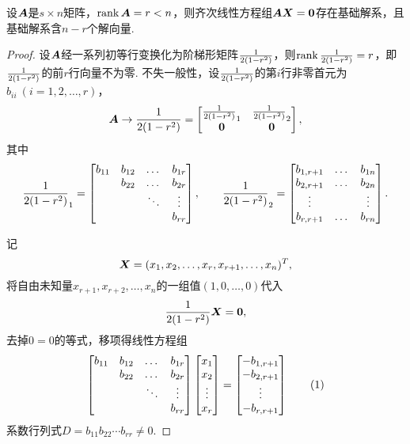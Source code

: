 \begin{theorem}\label{theorem:线性方程组.齐次线性方程组的解向量个数}
设\(\boldsymbol{A}\)是\(s \times n\)矩阵，\(\rank\boldsymbol{A} = r < n\)，则齐次线性方程组\(\boldsymbol{A}\boldsymbol{X}=\boldsymbol{0}\)存在基础解系，且基础解系含\(n-r\)个解向量.
\begin{proof}
设\(\boldsymbol{A}\)经一系列初等行变换化为阶梯形矩阵\(\frac{1}{2(1-r^2)}\)，则\(\rank\frac{1}{2(1-r^2)} = r\)，即\(\frac{1}{2(1-r^2)}\)的前\(r\)行向量不为零.
不失一般性，设\(\frac{1}{2(1-r^2)}\)的第\(i\)行非零首元为\(b_{ii}\ (i=1,2,\dotsc,r)\)，\[
\boldsymbol{A} \to \frac{1}{2(1-r^2)} = \begin{bmatrix}
\frac{1}{2(1-r^2)}_1 & \frac{1}{2(1-r^2)}_2 \\
\boldsymbol{0} & \boldsymbol{0}
\end{bmatrix},
\]其中\[
\frac{1}{2(1-r^2)}_1 = \begin{bmatrix}
b_{11} & b_{12} & \dots & b_{1r} \\
& b_{22} & \dots & b_{2r} \\
& & \ddots & \vdots \\
& & & b_{rr}
\end{bmatrix},
\qquad
\frac{1}{2(1-r^2)}_2 = \begin{bmatrix}
b_{1,r+1} & \dots & b_{1n} \\
b_{2,r+1} & \dots & b_{2n} \\
\vdots & & \vdots \\
b_{r,r+1} & \dots & b_{rn}
\end{bmatrix}.
\]

记\[
\boldsymbol{X} = (x_1,x_2,\dotsc,x_r,x_{r+1},\dotsc,x_n)^T,
\]将自由未知量\(x_{r+1},x_{r+2},\dotsc,x_n\)的一组值\((1,0,\dotsc,0)\)代入\[
\frac{1}{2(1-r^2)} \boldsymbol{X} = \boldsymbol{0},
\]去掉\(0 = 0\)的等式，移项得线性方程组\begin{gather}
\begin{bmatrix}
b_{11} & b_{12} & \dots & b_{1r} \\
& b_{22} & \dots & b_{2r} \\
& & \ddots & \vdots \\
& & & b_{rr}
\end{bmatrix}
\begin{bmatrix}
x_1 \\ x_2 \\ \vdots \\ x_r
\end{bmatrix}
=
\begin{bmatrix}
-b_{1,r+1} \\
-b_{2,r+1} \\
\vdots \\
-b_{r,r+1}
\end{bmatrix}
\tag1
\end{gather}系数行列式\(D = b_{11} b_{22} \dotsm b_{rr} \neq 0\).


\end{proof}
\end{theorem}
